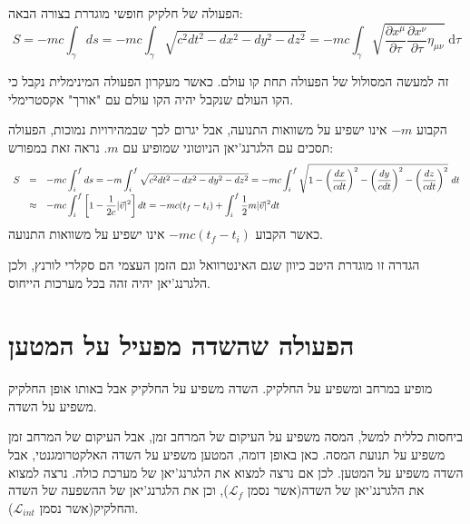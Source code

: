 \documentclass{tstextbook}
\begin{document}
\begin{definition}
הפעולה של חלקיק חופשי מוגדרת בצורה הבאה:
$$S=-mc\int_\gamma d s=-mc\int_\gamma\sqrt{c^2d t^{2}-d x^{2}-d y^{2}-d z^{2}}=-mc \int_{\gamma} \sqrt{ \frac{\partial x^\mu}{\partial \tau} \frac{\partial x^\nu}{\partial \tau} \eta_{\mu \nu} } \;\mathrm{d}\tau$$

\end{definition}
\begin{remark}
זה למעשה המסולול של הפעולה תחת קו עולם. כאשר מעקרון הפעולה המינימלית נקבל כי הקו העולם שנקבל יהיה הקו עולם עם "אורך" אקסטרימלי.

\end{remark}
הקבוע \(-m\) אינו ישפיע על משוואות התנועה, אבל יגרום לכך שבמהירויות נמוכות, הפעולה תסכים עם הלגרנג'יאן הניוטוני שמופיע עם \(m\). נראה זאת במפורש:
$$\begin{array}{r c l}{{S}}&{{=}}&{{\displaystyle-mc\int_{i}^{f}d s=-m\int_{i}^{f}\sqrt{c^2d t^{2}-d x^{2}-d y^{2}-d z^{2}}=-mc\int_{i}^{f}\sqrt{1-\left( \frac{d x}{cd t} \right)^{2}-\left( \frac{d y}{cd t} \right)^{2}-\left( \frac{d z}{cd t} \right)^{2}}~d t}}\\ {{}}&{{\approx}}&{{\displaystyle-mc\int_{i}^{f}\left[ 1-\frac{1}{2c}|\vec{v}|^{2} \right]d t=-mc(t_{f}-t_{i})+\int_{i}^{f}\frac{1}{2}m|\vec{v}|^{2}d t}}\end{array}$$
כאשר הקבוע \(-mc(t_{f}-t_{i})\) אינו ישפיע על משוואות התנועה.

\begin{remark}
הגדרה זו מוגדרת היטב כיוון שגם האינטרוואל וגם הזמן העצמי הם סקלרי לורנץ, ולכן הלגרנג'יאן יהיה זהה בכל מערכות הייחוס.

\end{remark}
\section{הפעולה שהשדה מפעיל על המטען}

\begin{definition}[השדה]
מופיע במרחב ומשפיע על החלקיק. השדה משפיע על החלקיק אבל באותו אופן החלקיק משפיע על השדה.

\end{definition}
ביחסות כללית למשל, המסה משפיע על העיקום של המרחב זמן, אבל העיקום של המרחב זמן משפיע על תנועת המסה.
כאן באופן דומה, המטען משפיע על השדה האלקטרומגנטי, אבל השדה משפיע על המטען. לכן אם נרצה למצוא את הלגרנג'יאן של מערכת כולה. נרצה למצוא את הלגרנג'יאן של השדה(אשר נסמן \(\mathcal{L}_{f}\)), וכן את הלגרנג'יאן של ההשפעה של השדה והחלקיק(אשר נסמן \(\mathcal{L}_{int}\)).
\end{document}
